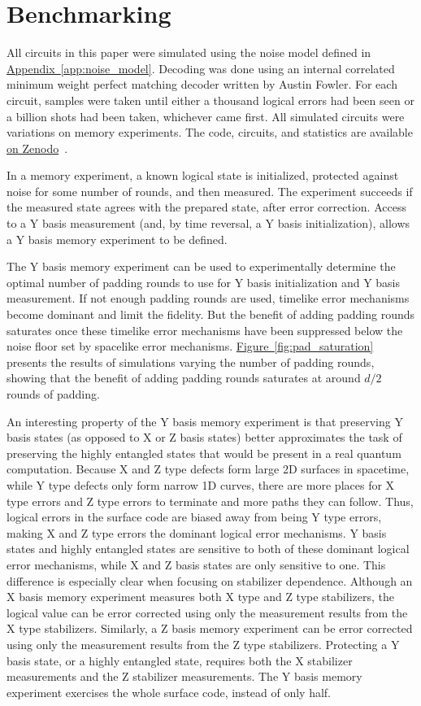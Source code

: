 \documentclass[onecolumn,unpublished,a4paper]{quantumarticle}
\theoremstyle{definition}
\theoremstyle{definition}
\theoremstyle{definition}
\DeclareRobustCommand{\app}[1]{\hyperref[app:#1]{Appendix~\ref*{app:#1}}}
\newcommand{\fig}[1]{\hyperref[fig:#1]{Figure~\ref*{fig:#1}}}
\begin{document}
\section{Benchmarking}
\label{sec:benchmarking}

All circuits in this paper were simulated using the noise model defined in \app{noise_model}.
Decoding was done using an internal correlated minimum weight perfect matching decoder written by Austin Fowler.
For each circuit, samples were taken until either a thousand logical errors had been seen or a billion shots had been taken, whichever came first.
All simulated circuits were variations on memory experiments.
The code, circuits, and statistics are available \href{https://doi.org/10.5281/zenodo.7487893}{on Zenodo}~\cite{gidneyybasisdata2022}.

In a memory experiment, a known logical state is initialized, protected against noise for some number of rounds, and then measured.
The experiment succeeds if the measured state agrees with the prepared state, after error correction.
Access to a Y basis measurement (and, by time reversal, a Y basis initialization), allows a Y basis memory experiment to be defined.

The Y basis memory experiment can be used to experimentally determine the optimal number of padding rounds to use for Y basis initialization and Y basis measurement.
If not enough padding rounds are used, timelike error mechanisms become dominant and limit the fidelity.
But the benefit of adding padding rounds saturates once these timelike error mechanisms have been suppressed below the noise floor set by spacelike error mechanisms.
\fig{pad_saturation} presents the results of simulations varying the number of padding rounds, showing that the benefit of adding padding rounds saturates at around $d/2$ rounds of padding.

An interesting property of the Y basis memory experiment is that preserving Y basis states (as opposed to X or Z basis states) better approximates the task of preserving the highly entangled states that would be present in a real quantum computation.
Because X and Z type defects form large 2D surfaces in spacetime, while Y type defects only form narrow 1D curves, there are more places for X type errors and Z type errors to terminate and more paths they can follow.
Thus, logical errors in the surface code are biased away from being Y type errors, making X and Z type errors the dominant logical error mechanisms.
Y basis states and highly entangled states are sensitive to both of these dominant logical error mechanisms, while X and Z basis states are only sensitive to one.
This difference is especially clear when focusing on stabilizer dependence.
Although an X basis memory experiment measures both X type and Z type stabilizers, the logical value can be error corrected using only the measurement results from the X type stabilizers.
Similarly, a Z basis memory experiment can be error corrected using only the measurement results from the Z type stabilizers.
Protecting a Y basis state, or a highly entangled state, requires both the X stabilizer measurements and the Z stabilizer measurements.
The Y basis memory experiment exercises the whole surface code, instead of only half.
\end{document}
